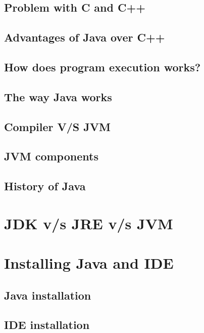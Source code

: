 \documentclass[14pt,fleqn]{extbook} %
\begin{document}
\subsection{Problem with C and C++}

\subsection{Advantages of Java over C++}

\subsection{How does program execution works?}

\subsection{The way Java works}

\subsection{Compiler V/S JVM}

\subsection{JVM components}

\subsection{History of Java}

\section{JDK v/s JRE v/s JVM}

\section{Installing Java and IDE}
%
\subsection{Java installation}

\subsection{IDE installation}

%
\end{document}
